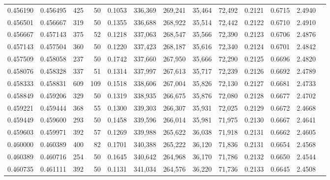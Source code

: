 \begin{tabular}{rrrrrrrrrrrrr}
0.456190 & 0.456495 &    425 &    50 &                                     0.1053 & 336,369 & 269,241 &  35,464 &  72,492 & 0.2121 & 0.6715 & 2.4940 \\
0.456501 & 0.456667 &    319 &    50 &                                     0.1355 & 336,688 & 268,922 &  35,514 &  72,442 & 0.2122 & 0.6710 & 2.4910 \\
0.456667 & 0.457143 &    375 &    52 &                                     0.1218 & 337,063 & 268,547 &  35,566 &  72,390 & 0.2123 & 0.6706 & 2.4876 \\
0.457143 & 0.457504 &    360 &    50 &                                     0.1220 & 337,423 & 268,187 &  35,616 &  72,340 & 0.2124 & 0.6701 & 2.4842 \\
0.457509 & 0.458058 &    237 &    50 &                                     0.1742 & 337,660 & 267,950 &  35,666 &  72,290 & 0.2125 & 0.6696 & 2.4820 \\
0.458076 & 0.458328 &    337 &    51 &                                     0.1314 & 337,997 & 267,613 &  35,717 &  72,239 & 0.2126 & 0.6692 & 2.4789 \\
0.458333 & 0.458831 &    609 &   109 &                                     0.1518 & 338,606 & 267,004 &  35,826 &  72,130 & 0.2127 & 0.6681 & 2.4733 \\
0.458849 & 0.459206 &    329 &    50 &                                     0.1319 & 338,935 & 266,675 &  35,876 &  72,080 & 0.2128 & 0.6677 & 2.4702 \\
0.459221 & 0.459444 &    368 &    55 &                                     0.1300 & 339,303 & 266,307 &  35,931 &  72,025 & 0.2129 & 0.6672 & 2.4668 \\
0.459449 & 0.459600 &    293 &    50 &                                     0.1458 & 339,596 & 266,014 &  35,981 &  71,975 & 0.2130 & 0.6667 & 2.4641 \\
0.459603 & 0.459971 &    392 &    57 &                                     0.1269 & 339,988 & 265,622 &  36,038 &  71,918 & 0.2131 & 0.6662 & 2.4605 \\
0.460000 & 0.460389 &    400 &    82 &                                     0.1701 & 340,388 & 265,222 &  36,120 &  71,836 & 0.2131 & 0.6654 & 2.4568 \\
0.460389 & 0.460716 &    254 &    50 &                                     0.1645 & 340,642 & 264,968 &  36,170 &  71,786 & 0.2132 & 0.6650 & 2.4544 \\
0.460735 & 0.461111 &    392 &    50 &                                     0.1131 & 341,034 & 264,576 &  36,220 &  71,736 & 0.2133 & 0.6645 & 2.4508 \\

\end{tabular}
